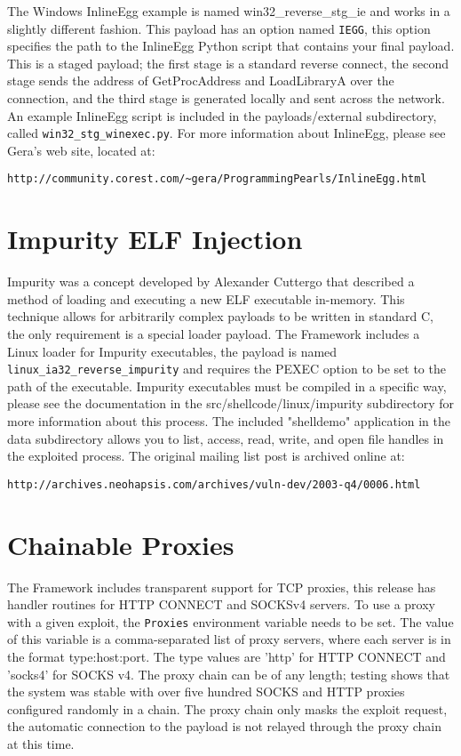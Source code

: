 \documentclass{report}
\begin{document}
\par
The Windows InlineEgg example is named win32\_reverse\_stg\_ie and works in a
slightly different fashion. This payload has an option named \texttt{IEGG}, this option
specifies the path to the InlineEgg Python script that contains your final
payload. This is a staged payload; the first stage is a standard reverse
connect, the second stage sends the address of GetProcAddress and LoadLibraryA
over the connection, and the third stage is generated locally and sent across
the network. An example InlineEgg script is included in the payloads/external
subdirectory, called \texttt{win32\_stg\_winexec.py}. For more information about
InlineEgg, please see Gera's web site, located at: 

\begin{verbatim}
http://community.corest.com/~gera/ProgrammingPearls/InlineEgg.html
\end{verbatim}


\section{Impurity ELF Injection}
\par
Impurity was a concept developed by Alexander Cuttergo that described a method
of loading and executing a new ELF executable in-memory. This technique allows
for arbitrarily complex payloads to be written in standard C, the only
requirement is a special loader payload. The Framework includes a Linux loader
for Impurity executables, the payload is named
\texttt{linux\_ia32\_reverse\_impurity} and requires the PEXEC option to be set
to the path of the executable. Impurity executables must be compiled in a
specific way, please see the documentation in the src/shellcode/linux/impurity
subdirectory for more information about this process. The included "shelldemo"
application in the data subdirectory allows you to list, access, read, write,
and open file handles in the exploited process. The original mailing list post
is archived online at:   

\begin{verbatim}
http://archives.neohapsis.com/archives/vuln-dev/2003-q4/0006.html
\end{verbatim}

\section{Chainable Proxies}
\par
The Framework includes transparent support for TCP proxies, this release has
handler routines for HTTP CONNECT and SOCKSv4 servers. To use a proxy with a
given exploit, the \texttt{Proxies} environment variable needs to be set. The value of
this variable is a comma-separated list of proxy servers, where each server is
in the format type:host:port. The type values are 'http' for HTTP CONNECT and
'socks4' for SOCKS v4. The proxy chain can be of any length; testing shows that
the system was stable with over five hundred SOCKS and HTTP proxies configured
randomly in a chain. The proxy chain only masks the exploit request, the
automatic connection to the payload is not relayed through the proxy chain at
this time. 
\end{document}
